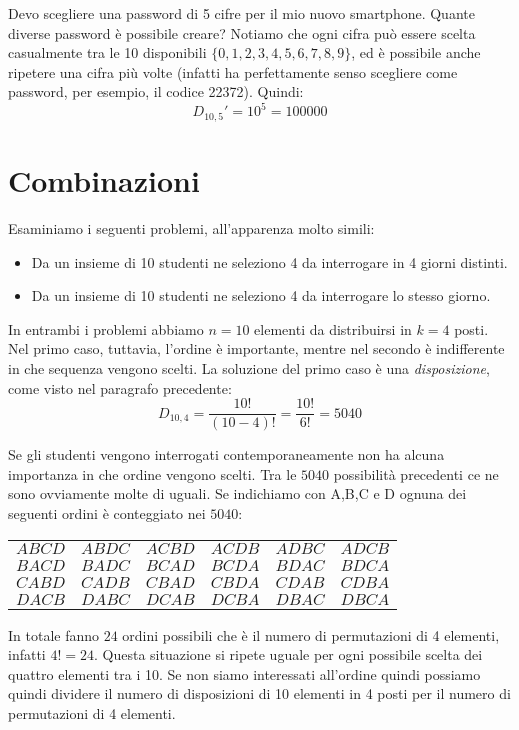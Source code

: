 \begin{esempio}
Devo scegliere una password di 5 cifre per il mio nuovo smartphone.
Quante diverse password è possibile creare? Notiamo che ogni cifra può essere scelta casualmente
tra le 10 disponibili \(\{0,1,2,3,4,5,6,7,8,9\}\), ed è possibile anche ripetere una cifra più volte (infatti
ha perfettamente senso scegliere come password, per esempio, il codice 22372). Quindi:
\[D_{10,5}' = 10^5 = 100000\]

\end{esempio}

\section{Combinazioni}
\label{sec:04_combinazioni}
Esaminiamo i seguenti problemi, all'apparenza molto simili:
\begin{itemize}
\item Da un insieme di 10 studenti ne seleziono 4 da interrogare in 4 giorni distinti.
\item Da un insieme di 10 studenti ne seleziono 4 da interrogare lo stesso giorno.
\end{itemize}
In entrambi i problemi abbiamo \(n=10\) elementi da distribuirsi in \(k=4\) posti. 
Nel primo caso, tuttavia, l'ordine è importante, mentre nel secondo 
è indifferente in che sequenza vengono scelti.
La soluzione del primo caso è una \emph{disposizione}, come visto nel paragrafo 
precedente:
\[D_{10,4} = \dfrac{10!}{(10-4)!}=\dfrac{10!}{6!}=5040\]

Se gli studenti vengono interrogati contemporaneamente non ha alcuna importanza 
in che ordine vengono scelti. 
Tra le \(5040\) possibilità precedenti ce ne sono ovviamente molte di uguali. Se 
indichiamo con A,B,C e D ognuna dei seguenti ordini è conteggiato nei \(5040\):
\begin{center}
\begin{tabular}{cccccc}
\(A B C D\) & \(A B D C\) & \(A C B D\) & \(A C D B\) & \(A D B C \) & \(A D C B\)\\
\(B A C D\) & \(B A D C\) & \(B C A D\) & \(B C D A\) & \(B D A C \) & \(B D C A\)\\
\(C A B D\) & \(C A D B\) & \(C B A D\) & \(C B D A\) & \(C D A B \) & \(C D B A\)\\
\(D A C B\) & \(D A B C\) & \(D C A B\) & \(D C B A\) & \(D B A C \) & \(D B C A\)\\
\end{tabular}
\end{center}
In totale fanno \(24\) ordini possibili che è il numero di permutazioni di 4 
elementi, infatti \(4!=24\). Questa situazione si ripete uguale per ogni 
possibile scelta dei quattro elementi tra i 10. Se non siamo interessati 
all'ordine quindi possiamo quindi dividere il numero di disposizioni di 10 
elementi in 4 posti per il numero di permutazioni di 4 elementi.

